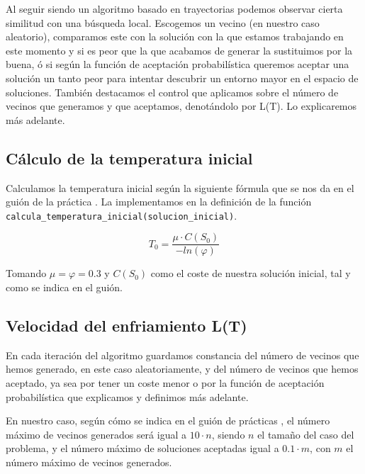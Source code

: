 Al seguir siendo un algoritmo basado en trayectorias podemos observar cierta similitud con una búsqueda local.
Escogemos un vecino (en nuestro caso aleatorio), comparamos este con la solución con la que estamos trabajando en este
momento y si es peor que la que acabamos de generar la sustituimos por la buena, ó si según la función de aceptación
probabilística queremos aceptar una solución un tanto peor para intentar descubrir un entorno mayor en el espacio de soluciones.
También destacamos el control que aplicamos sobre el número de vecinos que generamos y que aceptamos, denotándolo por L(T).
Lo explicaremos más adelante.

\begin{minipage}{\textwidth}
	\subsection{Cálculo de la temperatura inicial}
	
	Calculamos la temperatura inicial según la siguiente fórmula que se nos da en el guión de la práctica \cite{GuionPracticas3MH}.
	La implementamos en la definición de la función \texttt{calcula\_temperatura\_inicial(solucion\_inicial)}.

	$$ T_0 = \frac{\mu \cdot C(S_0)}{-ln(\varphi )} $$

	Tomando $\mu = \varphi = 0.3$ y $C(S_0)$ como el coste de nuestra solución inicial, tal y como se indica en el guión.
\end{minipage}

\begin{minipage}{\textwidth}
	\subsection{Velocidad del enfriamiento L(T)}

	En cada iteración del algoritmo guardamos constancia del número de vecinos que hemos generado, en este caso aleatoriamente,
	y del número de vecinos que hemos aceptado, ya sea por tener un coste menor o por la función de aceptación probabilística que
	explicamos y definimos más adelante.

	En nuestro caso, según cómo se indica en el guión de prácticas \cite{GuionPracticas3MH}, el número máximo de vecinos generados
	será igual a $10\cdot n$, siendo $n$ el tamaño del caso del problema, y el número máximo de soluciones aceptadas igual a
	$0.1\cdot m$, con $m$ el número máximo de vecinos generados.
\end{minipage}

